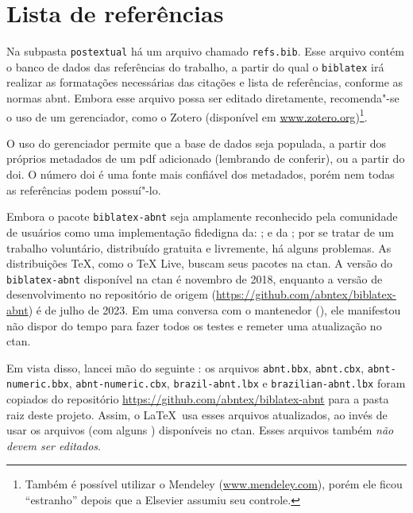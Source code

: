 \section{Lista de referências}

Na subpasta \texttt{postextual} há um arquivo chamado \texttt{refs.bib}. Esse arquivo contém o banco de dados das referências do trabalho, a partir do qual o \texttt{biblatex} irá realizar as formatações necessárias das citações e lista de referências, conforme as normas \ac{abnt}. Embora esse arquivo possa ser editado diretamente, recomenda"-se o uso de um gerenciador, como o Zotero (disponível em \url{www.zotero.org})\footnote{Também é possível utilizar o Mendeley (\url{www.mendeley.com}), porém ele ficou \enquote{estranho} depois que a Elsevier assumiu seu controle.}.

O uso do gerenciador permite que a base de dados seja populada, a partir dos próprios metadados de um \ac{pdf} adicionado (lembrando de conferir), ou a partir do \ac{doi}. O número \ac{doi} é uma fonte mais confiável dos metadados, porém nem todas as referências podem possuí"-lo.

Embora o pacote \texttt{biblatex-abnt} seja amplamente reconhecido pela comunidade de usuários como uma implementação fidedigna da: ; e da ; por se tratar de um trabalho voluntário, distribuído gratuita e livremente, há alguns problemas. As distribuições \TeX, como o TeX Live, buscam seus pacotes na \ac{ctan}. A versão do \texttt{biblatex-abnt} disponível na \ac{ctan} é novembro de 2018, enquanto a versão de desenvolvimento no repositório de origem (\url{https://github.com/abntex/biblatex-abnt}) é de julho de 2023. Em uma conversa com o mantenedor (), ele manifestou não dispor do tempo para fazer todos os testes e remeter uma atualização no \ac{ctan}.

Em vista disso, lancei mão do seguinte : os arquivos \texttt{abnt.bbx}, \texttt{abnt.cbx}, \texttt{abnt-numeric.bbx}, \texttt{abnt-numeric.cbx}, \texttt{brazil-abnt.lbx} e \texttt{brazilian-abnt.lbx} foram copiados do repositório \url{https://github.com/abntex/biblatex-abnt} para a pasta raiz deste projeto. Assim, o \LaTeX\ usa esses arquivos atualizados, ao invés de usar os arquivos (com alguns ) disponíveis no \ac{ctan}. Esses arquivos também \emph{não devem ser editados}.
